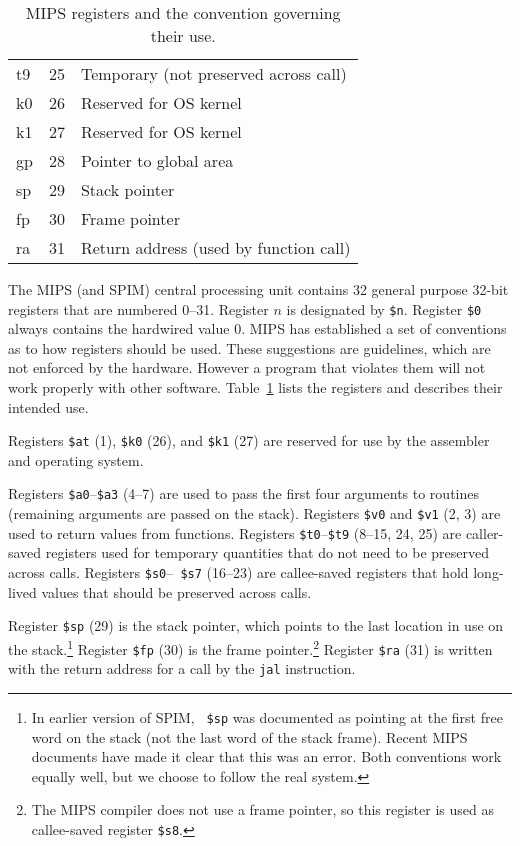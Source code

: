 \documentclass[11pt]{article}
\begin{document}
\begin{table}
\begin{center}
\begin{tabular}{|l|r|l|}
      t9 & 25 & Temporary (not preserved across call) \\
      k0 & 26 & Reserved for OS kernel \\
      k1 & 27 & Reserved for OS kernel \\
      gp & 28 & Pointer to global area \\
      sp & 29 & Stack pointer \\
      fp & 30 & Frame pointer \\
      ra & 31 & Return address (used by function call) \\
     \hline
  \end{tabular}
  \end{center}
  \caption{MIPS registers and the convention governing their use.}
  \label{tab:reg}
\end{table}

The MIPS (and SPIM) central processing unit contains 32 general
purpose 32-bit registers that are numbered 0--31.  Register $n$ is designated
by {\tt \$n}.  Register {\tt \$0} always contains the hardwired value
0.  MIPS has established a set of conventions as to how registers
should be used.  These suggestions are guidelines, which are not
enforced by the hardware.  However a program that violates them will
not work properly with other software.  Table~\ref{tab:reg} lists the
registers and describes their intended use.

Registers {\tt \$at} (1), {\tt \$k0} (26), and {\tt \$k1} (27) are
reserved for use by the assembler and operating system.

Registers {\tt \$a0}--{\tt \$a3} (4--7) are used to pass the first
four arguments to routines (remaining arguments are passed on the
stack).  Registers {\tt \$v0} and {\tt \$v1} (2, 3) are used to return
values from functions.  Registers {\tt \$t0}--{\tt \$t9} (8--15, 24,
25) are caller-saved registers used for temporary quantities that do
not need to be preserved across calls.  Registers {\tt \$s0}--{\tt
\$s7} (16--23) are callee-saved registers that hold long-lived values
that should be preserved across calls.

Register {\tt \$sp} (29) is the stack pointer, which points to the last
location in use on the stack.\footnote{In earlier version of SPIM, {\tt
\$sp} was documented as pointing at the first free word on the stack (not
the last word of the stack frame).  Recent MIPS documents have made it clear
that this was an error.  Both conventions work equally well, but we choose
to follow the real system.}  Register {\tt \$fp} (30) is the frame
pointer.\footnote{The MIPS compiler does not use a frame pointer, so this
register is used as callee-saved register {\tt \$s8}.} Register {\tt \$ra}
(31) is written with the return address for a call by the {\tt jal}
instruction.
\end{document}

